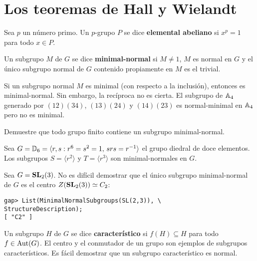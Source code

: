 \chapter{Los teoremas de Hall y Wielandt}
\label{HallWielandt}

\begin{definition}
	Sea $p$ un número primo. Un $p$-grupo $P$ se dice \textbf{elemental
	abeliano} si $x^p=1$ para todo $x\in P$.
\end{definition}

\begin{definition}
	Un subgrupo $M$ de $G$ se dice \textbf{minimal-normal} si $M\ne1$,
	$M$ es normal en $G$ y el único subgrupo normal de $G$ contenido
	propiamente en $M$ es el trivial. 
\end{definition}

\begin{example}
	Si un subgrupo normal $M$ es minimal (con respecto a la inclusión),
	entonces es minimal-normal. Sin embargo, la recíproca no es cierta.  El
	subgrupo de $\mathbb{A}_4$ generado por $(12)(34)$, $(13)(24)$ y $(14)(23)$ es
	normal-minimal en $\mathbb{A}_4$ pero no es minimal. 
\end{example}

\begin{exercise}
	Demuestre que todo grupo finito contiene un subgrupo minimal-normal. 
\end{exercise}

\begin{example}
	Sea $G=\mathbb{D}_{6}=\langle r,s:r^6=s^2=1,\,srs=r^{-1}\rangle$ el grupo diedral
	de doce elementos. Los subgrupos $S=\langle r^2\rangle$ 
	y $T=\langle r^3\rangle$ son minimal-normales en $G$.
\end{example}

\begin{example}
	Sea $G=\mathbf{SL}_2(3)$. No es difícil demostrar que el único subgrupo
	minimal-normal de $G$ es el centro $Z(\mathbf{SL}_2(3))\simeq C_2$:
\begin{lstlisting}
gap> List(MinimalNormalSubgroups(SL(2,3)), \
StructureDescription);
[ "C2" ]
\end{lstlisting}
\end{example}

Un subgrupo $H$ de $G$ se dice \textbf{característico} si 
$f(H)\subseteq H$ para todo $f\in\operatorname{Aut}(G)$. 
El centro y el conmutador de un grupo son ejemplos de subgrupos característicos. 
Es fácil demostrar que
un subgrupo característico es normal.  

